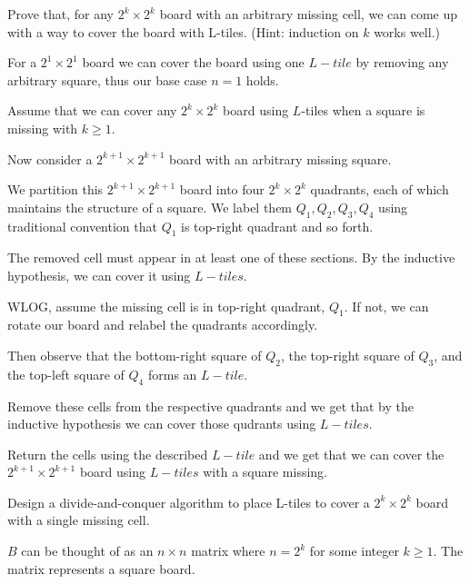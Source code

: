 \begin{questions}
	\question[5] Prove that, for any $2^k \times 2^k$ board with an arbitrary missing cell, we can come up with a way to cover the board with L-tiles. (Hint: induction on $k$ works well.)

	\begin{soln}
		For a \(2^1 \times 2^1\) board we can cover the board using one \(L-tile\) by removing any arbitrary square, thus our base case \(n = 1\) holds.

		Assume that we can cover any \(2^k \times 2^k\) board using \(L\)-tiles when a square is missing with \(k \geq 1\).

		Now consider a \(2^{k+1} \times 2^{k+1}\) board with an arbitrary missing square.

		We partition this \(2^{k+1} \times 2^{k+1}\) board into four \(2^k \times 2^k\) quadrants, each of which maintains the structure of a square. We label them \(Q_1, Q_2, Q_3, Q_4\) using traditional convention that \(Q_1\) is top-right quadrant and so forth.

		The removed cell must appear in at least one of these sections. By the inductive hypothesis, we can cover it using \(L-tiles\).

		WLOG, assume the missing cell is in top-right quadrant, \(Q_1\). If not, we can rotate our board and relabel the quadrants accordingly.

		Then observe that the bottom-right square of \(Q_2\), the top-right square of \(Q_3\), and the top-left square of \(Q_4\) forms an \(L-tile\).

		Remove these cells from the respective quadrants and we get that by the inductive hypothesis we can cover those qudrants using \(L-tiles\).

		Return the cells using the described \(L-tile\) and we get that we can cover the \(2^{k+1} \times 2^{k+1}\) board using \(L-tiles\) with a square missing.

	\end{soln}


	\ifsolutions\fi

	\question[5] Design a divide-and-conquer algorithm to place L-tiles to cover a $2^k \times 2^k$ board with a single missing cell.

		\begin{soln}
     \(B\) can be thought of as an \( n \times n \) matrix where \( n = 2^k \) for some integer \( k \geq 1 \). The matrix represents a square board. 


\end{soln}
\end{questions}
